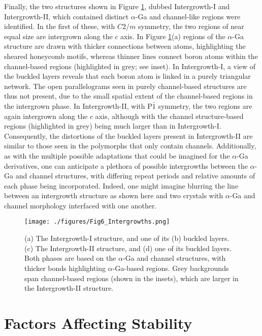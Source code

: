 \documentclass[reprint,aps,prl,twocolumn,letterpaper]{revtex4-2}
\newlength{\figurewidth}
\begin{document}
Finally, the two structures shown in Figure \ref{fig:Fig6_Intergrowths.png}, dubbed Intergrowth-I and Intergrowth-II, which contained distinct $\alpha$-Ga and channel-like regions were identified. In the first of these, with $C2/m$ symmetry, the two regions of near equal size are intergrown along the $c$ axis. In Figure \ref{fig:Fig6_Intergrowths.png}(a) regions of the $\alpha$-Ga structure are drawn with thicker connections between atoms, highlighting the sheared honeycomb motifs, whereas thinner lines connect boron atoms within the channel-based regions (highlighted in grey; see inset). In Intergrowth-I, a view of the buckled layers reveals that each boron atom is linked in a purely triangular network. The open parallelograms seen in purely channel-based structures are thus not present, due to the small spatial extent of the channel-based regions in the intergrown phase. In Intergrowth-II, with P$\bar{1}$ symmetry, the two regions are again intergrown along the $c$ axis, although with the channel structure-based regions (highlighted in grey) being much larger than in Intergrowth-I. Consequently, the distortions of the buckled layers present in Intergrowth-II are similar to those seen in the polymorphs that only contain channels. Additionally, as with the multiple possible adaptations that could be imagined for the $\alpha$-Ga derivatives, one can anticipate a plethora of possible intergrowths between the $\alpha$-Ga and channel structures, with differing repeat periods and relative amounts of each phase being incorporated. Indeed, one might imagine blurring the line between an intergrowth structure as shown here and two crystals with $\alpha$-Ga and channel morphology interfaced with one another.


\begin{figure}
\begin{center}
\texttt{[image: ./figures/Fig6\_Intergrowths.png]}
\end{center}
\caption{(a) The Intergrowth-I structure, and one of its (b) buckled layers. (c) The Intergrowth-II structure, and (d) one of its buckled layers.  Both phases are  based on the $\alpha$-Ga and channel structures, with thicker bonds highlighting $\alpha$-Ga-based regions. Grey backgrounds span channel-based regions (shown in the insets), which are larger in the Intergrowth-II structure.  
\label{fig:Fig6_Intergrowths.png}}
\end{figure}


\section{Factors Affecting Stability}
\end{document}
